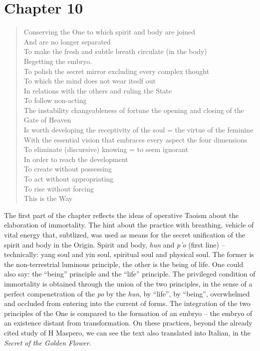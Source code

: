 \section{Chapter 10}

\begin{verse}
Conserving the One to which spirit and body are joined\\
And are no longer separated\\
To make the fresh and subtle breath circulate (in the body)\\
Begetting the embryo.\\
To polish the secret mirror excluding every complex thought\\
To which the mind does not wear itself out\\
In relations with the others and ruling the State\\
To follow non-acting\\
The instability changeableness of fortune the opening and closing of the Gate of Heaven \\
Is worth developing the receptivity of the soul = the virtue of the feminine \\
With the essential vision that embraces every aspect the four dimensions \\
To eliminate (discursive) knowing = to seem ignorant \\
In order to reach the development\\
To create without possessing\\
To act without appropriating\\
To rise without forcing\\
This is the Way
\end{verse}

The first part of the chapter reflects the ideas of operative Taoism about the elaboration of immortality. The hint about the practice with breathing, vehicle of vital energy that, subtlized, was used as means for the secret unification of the spirit and body in the Origin. Spirit and body, \emph{hun} and \emph{p'o} (first line) -- technically: yang soul and yin soul, spiritual soul and physical soul. The former is the non-terrestrial luminous principle, the other is the being of life. One could also say: the ``being'' principle and the ``life'' principle. The privileged condition of immortality is obtained through the union of the two principles, in the sense of a perfect compenetration of the
\emph{po} by the \emph{hun}, by ``life'', by ``being'', overwhelmed and occluded from entering into the current of forms. The integration of the two principles of the One is compared to the formation of an embryo -- the embryo of an existence distant from transformation. On these practices, beyond the already cited study of H Maspero, we can see the text also translated into Italian, in the \emph{Secret of the Golden Flower}.

